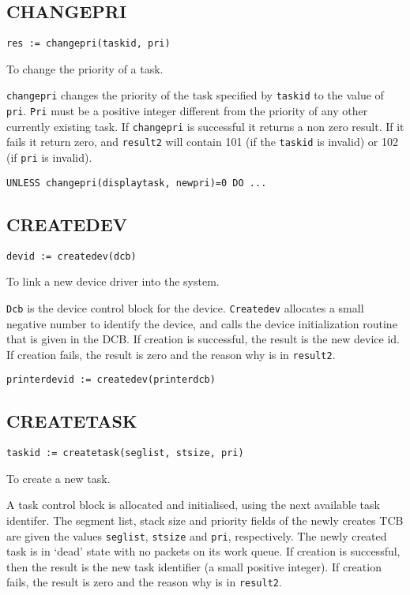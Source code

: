 \subsection{CHANGEPRI}

\verb|res := changepri(taskid, pri)|

  To change the priority of a task.


     \verb|changepri| changes the priority of the task specified by
\verb|taskid| to the value of \verb|pri|.  \verb|Pri| must be a 
positive integer different from the priority of any other currently
existing task.  If \verb|changepri| is successful it returns a non
zero result.  If it fails it return zero, and \verb|result2| will
contain 101 (if the \verb|taskid| is invalid) or 102 (if \verb|pri| is
invalid).

\verb|UNLESS changepri(displaytask, newpri)=0 DO ...|

\subsection{CREATEDEV}

\verb|devid := createdev(dcb)|

  To link a new device driver into the system.


     \verb|Dcb| is the device control block for the device.
\verb|Createdev| allocates a small negative number to identify the
device, and calls the device initialization routine that is given in
the DCB.  If creation is successful, the result is the new device id.
If creation fails, the result is zero and the reason why is in
\verb|result2|.

\verb|printerdevid := createdev(printerdcb)|


\subsection{CREATETASK}

\verb|taskid := createtask(seglist, stsize, pri)|

  To create a new task.


     A task control block is allocated and initialised, using the next
available task identifer.  The segment list, stack size and priority
fields of the newly creates TCB are given the values \verb|seglist|,
\verb|stsize| and \verb|pri|, respectively.  The newly created task is
in `dead' state with no packets on its work queue.  If creation is
successful, then the result is the new task identifier (a small
positive integer).  If creation fails, the result is zero and the
reason why is in \verb|result2|.

